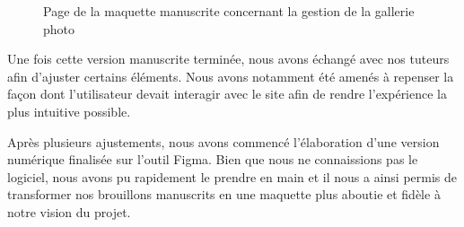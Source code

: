 \begin{figure}[H]
    \captionsetup{justification=centering}
    \caption{Page de la maquette manuscrite concernant la gestion de la gallerie photo}
\end{figure}


Une fois cette version manuscrite terminée, nous avons échangé avec nos tuteurs afin d’ajuster certains éléments.
Nous avons notamment été amenés à repenser la façon dont l'utilisateur devait interagir avec le site afin de rendre l'expérience la plus intuitive possible.


Après plusieurs ajustements, nous
avons commencé l'élaboration d'une version numérique finalisée sur l'outil Figma.
Bien que nous ne connaissions pas le logiciel, nous avons pu rapidement le prendre en main et il nous a ainsi permis de transformer nos brouillons manuscrits en une maquette plus aboutie et fidèle à notre vision du projet.

